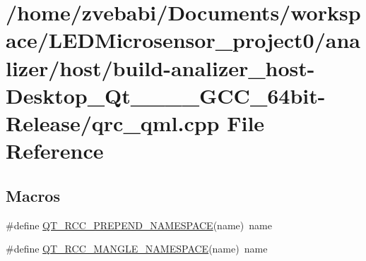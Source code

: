 \hypertarget{build-analizer__host-_desktop___qt__5__9__0___g_c_c__64bit-_release_2qrc__qml_8cpp}{\section{/home/zvebabi/\+Documents/workspace/\+L\+E\+D\+Microsensor\+\_\+project0/analizer/host/build-\/analizer\+\_\+host-\/\+Desktop\+\_\+\+Qt\+\_\+\_\+\_\+\_\+\+G\+C\+C\+\_\+64bit-\/\+Release/qrc\+\_\+qml.cpp File Reference}
\label{build-analizer__host-_desktop___qt__5__9__0___g_c_c__64bit-_release_2qrc__qml_8cpp}
}
\subsection*{Macros}
\begin{DoxyCompactItemize}
\item 
\#define \hyperlink{build-analizer__host-_desktop___qt__5__9__0___g_c_c__64bit-_release_2qrc__qml_8cpp_afbfc3bb3cd2fa03dd0a3fc36563480d6}{Q\+T\+\_\+\+R\+C\+C\+\_\+\+P\+R\+E\+P\+E\+N\+D\+\_\+\+N\+A\+M\+E\+S\+P\+A\+C\+E}(name)~name
\item 
\#define \hyperlink{build-analizer__host-_desktop___qt__5__9__0___g_c_c__64bit-_release_2qrc__qml_8cpp_a590f80ddb226779f6f432d80438ea190}{Q\+T\+\_\+\+R\+C\+C\+\_\+\+M\+A\+N\+G\+L\+E\+\_\+\+N\+A\+M\+E\+S\+P\+A\+C\+E}(name)~name
\end{DoxyCompactItemize}
